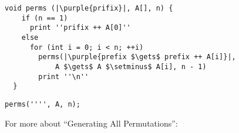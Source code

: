 \begin{frame}[fragile]{}
  \begin{lstlisting}[style = Cstyle]
  void perms (|\purple{prifix}|, A[], n) {
    if (n == 1)
      print ''prifix ++ A[0]''
    else 
      for (int i = 0; i < n; ++i)
        perms(|\purple{prefix $\gets$ prefix ++ A[i]}|, 
            A $\gets$ A $\setminus$ A[i], n - 1) 
        print ''\n''
  }
  \end{lstlisting}

  \pause
  \begin{lstlisting}[style = Cstyle]
  perms('''', A, n);
  \end{lstlisting}
\end{frame}

\begin{frame}{}
  \centerline{\Large For more about ``Generating All Permutations'':}

  \vspace{0.30cm}
  \begin{columns}
  \end{columns}
\end{frame}
